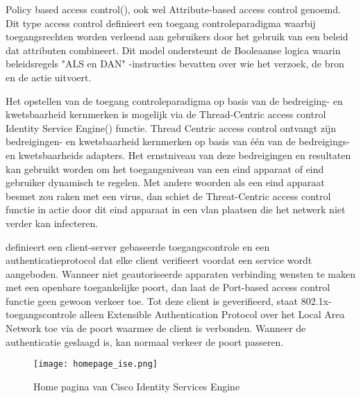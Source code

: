 \newpage
{}
\newline
Policy based access control(\cite{ABAC}), ook wel Attribute-based access control genoemd. Dit type access control definieert een toegang controleparadigma waarbij toegangsrechten worden verleend aan gebruikers door het gebruik van een beleid dat attributen combineert. Dit model ondersteunt de Booleaanse logica waarin beleidsregels "ALS en DAN" -instructies bevatten over wie het verzoek, de bron en de actie uitvoert.

\newline
Het opstellen van de toegang controleparadigma op basis van de bedreiging- en kwetsbaarheid kernmerken is mogelijk via de Thread-Centric access control Identity Service Engine(\cite{TCNAC}) functie. Thread Centric access control ontvangt zijn bedreigingen- en kwetsbaarheid kernmerken op basis van één van de bedreigings- en kwetsbaarheids adapters. Het ernstniveau van deze bedreigingen en resultaten kan gebruikt worden om het toegangsniveau van een eind apparaat of eind gebruiker dynamisch te regelen.
\newline
\newline
Met andere woorden als een eind apparaat besmet zou raken met een virus, dan schiet de Threat-Centric access control functie in actie door dit eind apparaat in een vlan plaatsen die het netwerk niet verder kan infecteren. 

\newline
\cite{PBAC} definieert een client-server gebaseerde toegangscontrole en een authenticatieprotocol dat elke client verifieert voordat een service wordt aangeboden. Wanneer niet geautoriseerde apparaten verbinding wensten te maken met een openbare toegankelijke poort, dan laat de Port-based access control functie geen gewoon verkeer toe.
\newline
\newline
Tot deze client is geverifieerd, staat 802.1x-toegangscontrole alleen Extensible Authentication Protocol over het Local Area Network toe via de poort waarmee de client is verbonden. Wanneer de authenticatie geslaagd is, kan normaal verkeer de poort passeren.

\begin{figure}[H]
	\centering
	\texttt{[image: homepage\_ise.png]}
	\caption{Home pagina van Cisco Identity Services Engine}
	\label{fig:homeISE}
\end{figure}

